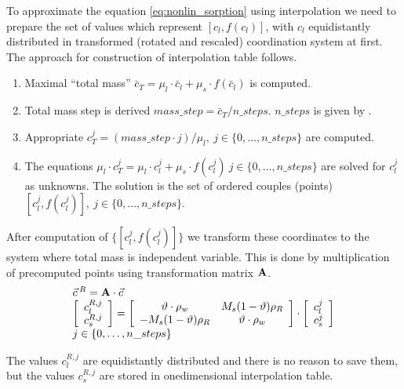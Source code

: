 To approximate the equation \eqref{eq:nonlin_sorption} using interpolation we need to prepare the set of values 
which represent $[c_l, f(c_l)]$, with $c_l$ equidistantly distributed in transformed (rotated and rescaled) 
coordination system at first. The approach for construction of interpolation table follows.
\begin{enumerate}
 \item Maximal ``total mass'' $\bar{c}_T = \mu_l\cdot \bar{c}_l + \mu_s\cdot f(\bar{c}_l)$ is computed.
 \item Total mass step is derived $mass\_step = \bar{c}_T/n\_steps$. $n\_steps$ is given by
       .
 \item Appropriate $c_T^j = (mass\_step\cdot j)/\mu_l,~j\in \{0,\ldots, n\_steps\}$ are computed. 
 \item The equations $\mu_l \cdot c_T^j = \mu_l\cdot c_l^j + \mu_s\cdot f(c_l^j)~j\in \{0,\ldots, n\_steps\}$ are solved 
       for $c_l^j$ as unknowns. The solution is the set of ordered couples (points) 
       $[c_l^j,f(c_l^j)],~j\in\{0,\ldots,n\_steps\}$.
\end{enumerate}
After computation of $\{[c_l^j,f(c_l^j)]\}$ we transform these coordinates to the system where total mass is 
independent variable. This is done by multiplication of precomputed points using transformation matrix ${\bf A}$.
\begin{equation}
 \begin{array}{l}
  \vec{c}\,^R = {\bf A}\cdot\vec{c}\\
  \left[\begin{array}{c} c_l^{R,j}\\ c_s^{R,j} \end{array}\right] = 
  \left[\begin{array}{cc}
    \vartheta\cdot \rho_w & M_s(1 - \vartheta)\rho_R\\
    -M_s(1 - \vartheta)\rho_R & \vartheta\cdot \rho_w
  \end{array}\right]\cdot
  \left[\begin{array}{c} c_l^j\\ c_s^j \end{array}\right]\\
  j\in\{0,\ldots,n\_steps\}
 \end{array}
 \label{eq:transf_mat}
\end{equation}

The values $c_l^{R,j}$ are equidistantly distributed and there is no reason to save them, but the values 
$c_s^{R,j}$ are stored in onedimensional interpolation table.

